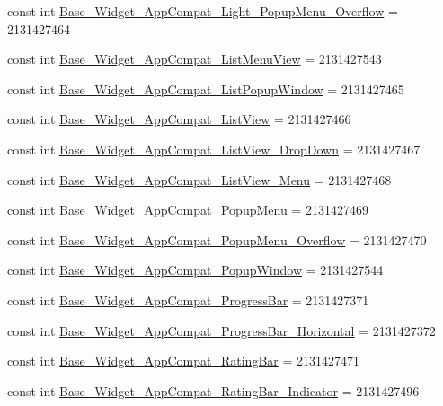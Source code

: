 \begin{CompactItemize}
\item 
const int \hyperlink{class__2doo_1_1_droid_1_1_resource_1_1_style_ae0519279f860b086b66dd76c0039829}{Base\_\-Widget\_\-AppCompat\_\-Light\_\-PopupMenu\_\-Overflow} = 2131427464
\item 
const int \hyperlink{class__2doo_1_1_droid_1_1_resource_1_1_style_55625811fda2c113079648968083125f}{Base\_\-Widget\_\-AppCompat\_\-ListMenuView} = 2131427543
\item 
const int \hyperlink{class__2doo_1_1_droid_1_1_resource_1_1_style_ad4d793d48365a84910be2b3c73aa5f5}{Base\_\-Widget\_\-AppCompat\_\-ListPopupWindow} = 2131427465
\item 
const int \hyperlink{class__2doo_1_1_droid_1_1_resource_1_1_style_9e773f3c29179b9dd683476eb6ca6f58}{Base\_\-Widget\_\-AppCompat\_\-ListView} = 2131427466
\item 
const int \hyperlink{class__2doo_1_1_droid_1_1_resource_1_1_style_1b64c76d7614e3b360764537612b184a}{Base\_\-Widget\_\-AppCompat\_\-ListView\_\-DropDown} = 2131427467
\item 
const int \hyperlink{class__2doo_1_1_droid_1_1_resource_1_1_style_20d021620417bbc30e651ecf64f2f4a8}{Base\_\-Widget\_\-AppCompat\_\-ListView\_\-Menu} = 2131427468
\item 
const int \hyperlink{class__2doo_1_1_droid_1_1_resource_1_1_style_bd1fcd83915a5cbe97791fb522fd11d5}{Base\_\-Widget\_\-AppCompat\_\-PopupMenu} = 2131427469
\item 
const int \hyperlink{class__2doo_1_1_droid_1_1_resource_1_1_style_075eae36885ed2fd0733ed2870743c3c}{Base\_\-Widget\_\-AppCompat\_\-PopupMenu\_\-Overflow} = 2131427470
\item 
const int \hyperlink{class__2doo_1_1_droid_1_1_resource_1_1_style_917c19c05fc9ab3c50aba706a930dde8}{Base\_\-Widget\_\-AppCompat\_\-PopupWindow} = 2131427544
\item 
const int \hyperlink{class__2doo_1_1_droid_1_1_resource_1_1_style_5637f783542eda8aa8a202c1249936e7}{Base\_\-Widget\_\-AppCompat\_\-ProgressBar} = 2131427371
\item 
const int \hyperlink{class__2doo_1_1_droid_1_1_resource_1_1_style_5232c05b13658096230ca5f3a84d9f1f}{Base\_\-Widget\_\-AppCompat\_\-ProgressBar\_\-Horizontal} = 2131427372
\item 
const int \hyperlink{class__2doo_1_1_droid_1_1_resource_1_1_style_b28e1707969d8191f9170f014ba30b31}{Base\_\-Widget\_\-AppCompat\_\-RatingBar} = 2131427471
\item 
const int \hyperlink{class__2doo_1_1_droid_1_1_resource_1_1_style_cb275c668e55353b3b33f68391c8d36c}{Base\_\-Widget\_\-AppCompat\_\-RatingBar\_\-Indicator} = 2131427496

\end{CompactItemize}
